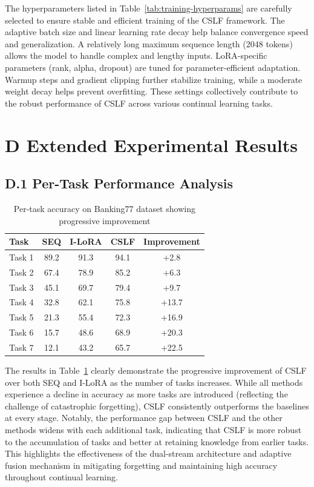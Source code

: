 \documentclass[11pt]{article}
\begin{document}
The hyperparameters listed in Table~\ref{tab:training-hyperparams} are carefully selected to ensure stable and efficient training of the CSLF framework. The adaptive batch size and linear learning rate decay help balance convergence speed and generalization. A relatively long maximum sequence length (2048 tokens) allows the model to handle complex and lengthy inputs. LoRA-specific parameters (rank, alpha, dropout) are tuned for parameter-efficient adaptation. Warmup steps and gradient clipping further stabilize training, while a moderate weight decay helps prevent overfitting. These settings collectively contribute to the robust performance of CSLF across various continual learning tasks.

\section*{D  Extended Experimental Results}

\subsection*{D.1 Per-Task Performance Analysis}

\begin{table}[t]
\centering
\begin{tabular}{lcccc}
\toprule
Task & SEQ & I-LoRA & CSLF & Improvement \\
\midrule
Task 1 & 89.2 & 91.3 & 94.1 & +2.8 \\
Task 2 & 67.4 & 78.9 & 85.2 & +6.3 \\
Task 3 & 45.1 & 69.7 & 79.4 & +9.7 \\
Task 4 & 32.8 & 62.1 & 75.8 & +13.7 \\
Task 5 & 21.3 & 55.4 & 72.3 & +16.9 \\
Task 6 & 15.7 & 48.6 & 68.9 & +20.3 \\
Task 7 & 12.1 & 43.2 & 65.7 & +22.5 \\
\bottomrule
\end{tabular}
\caption{Per-task accuracy on Banking77 dataset showing progressive improvement}
\label{tab:banking77-per-task}
\end{table}

The results in Table~\ref{tab:banking77-per-task} clearly demonstrate the progressive improvement of CSLF over both SEQ and I-LoRA as the number of tasks increases. While all methods experience a decline in accuracy as more tasks are introduced (reflecting the challenge of catastrophic forgetting), CSLF consistently outperforms the baselines at every stage. Notably, the performance gap between CSLF and the other methods widens with each additional task, indicating that CSLF is more robust to the accumulation of tasks and better at retaining knowledge from earlier tasks. This highlights the effectiveness of the dual-stream architecture and adaptive fusion mechanism in mitigating forgetting and maintaining high accuracy throughout continual learning.
\end{document}

